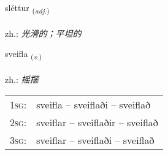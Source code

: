 \documentclass[frontgrid, backgrid]{flacards}\usepackage[]{graphicx}\usepackage[]{xcolor}
\begin{document}
\renewcommand{\flhead}{\vskip5pt \fboxsep=0pt {\small\bfseries\footnotesize Lýsingarorð | 形容词}}
\renewcommand{\fcfoot}{\vskip5pt \fboxsep=0pt \hspace{2pt}{\small\bfseries\footnotesize 3K}}

\renewcommand{\blhead}{\vskip5pt {\small\bfseries\footnotesize Lýsingarorð | 形容词 }}
\renewcommand{\bcfoot}{\vskip5pt \hspace{2pt}{\small\bfseries\footnotesize 3K}}


{sléttur \small{\textsubscript{(\textit{adj.})}} \\[1ex] %
\textphonetic{[stljɛhtʏr]} \\
zh.: \emph{光滑的；平坦的} \\  [2ex]
\renewcommand*{\arraystretch}{0.8}
}

\renewcommand{\flhead}{\vskip5pt \fboxsep=0pt {\small\bfseries\footnotesize Sagnorð | 动词}}
\renewcommand{\fcfoot}{\vskip5pt \fboxsep=0pt \hspace{2pt}{\small\bfseries\footnotesize 3K}}

\renewcommand{\blhead}{\vskip5pt {\small\bfseries\footnotesize Sagnorð | 动词 }}
\renewcommand{\bcfoot}{\vskip5pt \hspace{2pt}{\small\bfseries\footnotesize 3K}}


{sveifla \small{\textsubscript{(\textit{v.})}} \\[1ex] %
\textphonetic{[sveipla]} \\
zh.: \emph{摇摆} \\  [2ex]
\renewcommand*{\arraystretch}{0.8}
\begin{tabular}{p{1cm}l}
\textsc{1sg}: & sveifla -- sveiflaði -- sveiflað \\ 
\textsc{2sg}: & sveiflar -- sveiflaðir -- sveiflað \\ 
\textsc{3sg}: & sveiflar -- sveiflaði -- sveiflað \\ 
\end{tabular}
}
\end{document}
